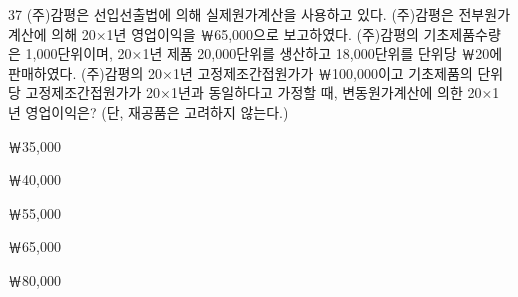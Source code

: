 \begin{question}{37}
(주)감평은 선입선출법에 의해 실제원가계산을 사용하고 있다. (주)감평은 전부원가계산에 의해 20×1년 영업이익을 ￦65,000으로 보고하였다. (주)감평의 기초제품수량은 1,000단위이며, 20×1년 제품 20,000단위를 생산하고 18,000단위를 단위당 ￦20에 판매하였다. (주)감평의 20×1년 고정제조간접원가가 ￦100,000이고 기초제품의 단위당 고정제조간접원가가 20×1년과 동일하다고 가정할 때, 변동원가계산에 의한 20×1년 영업이익은? (단, 재공품은 고려하지 않는다.)
\begin{choices}
  \item ￦35,000
  \item ￦40,000
  \item ￦55,000
  \item ￦65,000
  \item ￦80,000
\end{choices}
\end{question}
